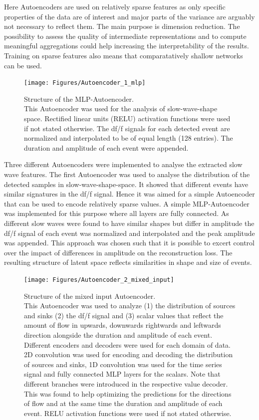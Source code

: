   Here Autoencoders are used on relatively sparse features as only specific properties of the data are of interest and major parts of the variance are arguably not necessary to reflect them. The main purpose is dimension reduction. The possibility to assess the quality of intermediate representations and to compute meaningful aggregations could help increasing the interpretability of the results. Training on sparse features also means that comparatatively shallow networks can be used.\\
\begin{figure}[!htb]
\centering
\texttt{[image: Figures/Autoencoder\_1\_mlp]}
\decoRule
\caption[Structure of the MLP Autoencoder]{Structure of the MLP-Autoencoder.\\ This Autoencoder was used for the analysis of slow-wave-shape space. Rectified linear units (RELU) activation functions were used if not stated otherwise. The df/f signals for each detected event are normalized and interpolated to be of equal length (128 entries). The duration and amplitude of each event were appended.}
\label{fig:Autoencoder_1_mlp}
\end{figure}
Three different Autoencoders were implemented to analyse the extracted slow wave features. The first Autoencoder was used to analyse the distribution of the detected samples in slow-wave-shape-space. It showed that different events have similar signatures in the df/f signal. Hence it was aimed for a simple Autoencoder that can be used to encode relatively sparse values. A simple MLP-Autoencoder was implemented for this purpose where all layers are fully connected. As different slow waves were found to have similar shapes but differ in amplitude the df/f signal of each event was normalized and interpolated and the peak amplitude was appended. This approach was chosen such that it is possible to excert control over the impact of differences in amplitude on the reconstruction loss. The resulting structure of latent space reflects similarities in shape and size of events.\\
\begin{figure}[!htb]
\centering
\texttt{[image: Figures/Autoencoder\_2\_mixed\_input]}
\decoRule
\caption[Structure of the mixed input Autoencoder]{Structure of the mixed input Autoencoder.\\ This Autoencoder was used to analyze (1) the distribution of sources and sinks (2) the df/f signal and (3) scalar values that reflect the amount of flow in upwards, downwards rightwards and leftwards direction alongside the duration and amplitude of each event. Different encoders and decoders were used for each domain of data. 2D convolution was used for encoding and decoding the distribution of sources and sinks, 1D convolution was used for the time series signal and fully connected MLP layers for the scalars. Note that different branches were introduced in the respective value decoder. This was found to help optimizing the predictions for the directions of flow and at the same time the duration and amplitude of each event. RELU activation functions were used if not stated otherwise.}
\label{fig:Autoencoder_2_mixed_input}
\end{figure}
